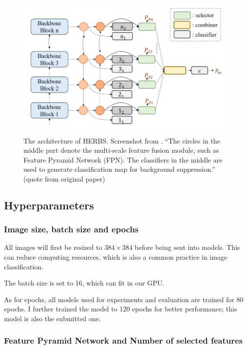 \documentclass[twocolumn]{extarticle}
\begin{document}
\begin{figure}[H]
\centering
\includegraphics[width=0.95\linewidth]{figure/herbs}
\caption{The architecture of HERBS. Screenshot from \cite{chou2023fine}. ``The circles in the middle part denote the multi-scale feature fusion module, such as Feature Pyramid Network (FPN). The classifiers in the middle are used to generate classification map for background suppression.'' (quote from original paper)}
\label{fig:herbs}
\end{figure}


\subsection{Hyperparameters}

\subsubsection{Image size, batch size and epochs}

All images will first be resized to $384 \times 384$ before being sent into models. This can reduce computing resources, which is also a common practice in image classification.

The batch size is set to 16, which can fit in our GPU.

As for epochs, all models used for experiments and evaluation are trained for 80 epochs. I further trained the model to 120 epochs for better performance;	 this model is also the submitted one.

\subsubsection{Feature Pyramid Network and Number of selected features}
\end{document}
